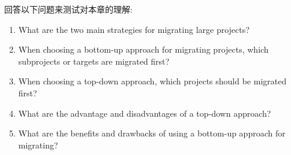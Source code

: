 回答以下问题来测试对本章的理解:

\begin{enumerate}
\item 
What are the two main strategies for migrating large projects?

\item 
When choosing a bottom-up approach for migrating projects, which subprojects or targets are migrated first?

\item 
When choosing a top-down approach, which projects should be migrated first?

\item 
What are the advantage and disadvantages of a top-down approach?

\item 
What are the benefits and drawbacks of using a bottom-up approach for migrating?
\end{enumerate}